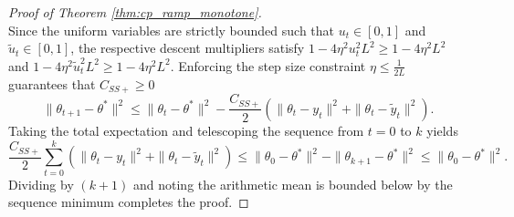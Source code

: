 \documentclass[letter,11pt]{article}
\begin{document}
\begin{proof}[Proof of Theorem \ref{thm:cp_ramp_monotone}]
\begin{equation}
\end{equation}
Since the uniform variables are strictly bounded such that $u_t \in [0, 1]$ and $\tilde{u}_t \in [0, 1]$, the respective descent multipliers satisfy $1 - 4\eta^2 u_t^2 L^2 \ge 1 - 4\eta^2 L^2$ and $1 - 4\eta^2 \tilde{u}_t^2 L^2 \ge 1 - 4\eta^2 L^2$. Enforcing the step size constraint $\eta \le \frac{1}{2L}$ guarantees that $C_{SS+} \ge 0$
\begin{equation}
\|\theta_{t+1} - \theta^*\|^2 \le \|\theta_t - \theta^*\|^2 - \frac{C_{SS+}}{2} \left( \|\theta_t - y_t\|^2 + \|\theta_t - \tilde{y}_t\|^2 \right).
\end{equation}
Taking the total expectation and telescoping the sequence from $t = 0$ to $k$ yields
\begin{equation}
\frac{C_{SS+}}{2} \sum_{t=0}^k \left( \|\theta_t - y_t\|^2 + \|\theta_t - \tilde{y}_t\|^2 \right) \le \|\theta_0 - \theta^*\|^2 - \|\theta_{k+1} - \theta^*\|^2 \le \|\theta_0 - \theta^*\|^2.
\end{equation}
Dividing by $(k+1)$ and noting the arithmetic mean is bounded below by the sequence minimum completes the proof.
\end{proof}
\end{document}
